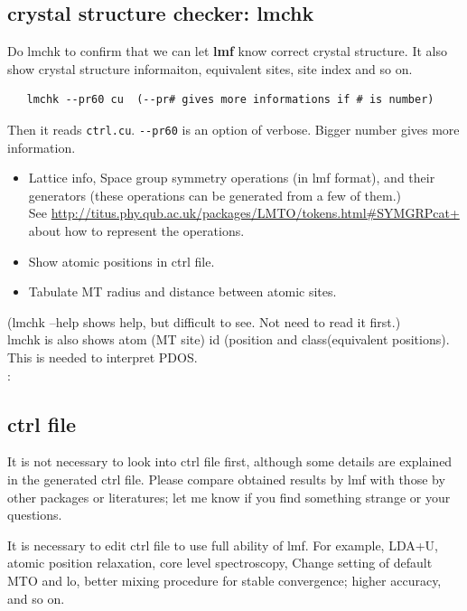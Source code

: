 \documentclass[a4paper,10pt,epsf,fleqn]{article}
\newcommand{\exe}[1]{{\bf #1}\index{#1}}
\begin{document}
\subsection{crystal structure checker: lmchk}
Do lmchk to confirm that we can let \exe{lmf} know correct crystal
structure. It also show crystal structure informaiton, equivalent sites,
site index and so on.
\begin{verbatim}
   lmchk --pr60 cu  (--pr# gives more informations if # is number)
\end{verbatim}
Then it reads \verb+ctrl.cu+. \verb+--pr60+ is an option of verbose. Bigger number gives more information.
\begin{itemize}
\item Lattice info, Space group symmetry operations (in lmf format), and
      their generators (these operations can be generated from a few of them.)\\
      See \url{http://titus.phy.qub.ac.uk/packages/LMTO/tokens.html#SYMGRPcat+}
      about how to represent the operations.
\item Show atomic positions in ctrl file. 
\item Tabulate MT radius and distance between atomic sites.
\end{itemize}
(lmchk --help shows help, but difficult to see. Not need to read it first.)\\

lmchk is also shows atom (MT site) id (position and class(equivalent
positions). This is needed to interpret PDOS.\\

:

\subsection{ctrl file}
It is not necessary to look into ctrl file first, 
although some details are explained in the generated ctrl file.
Please compare obtained results by lmf with those by other packages or literatures; 
let me know if you find something strange or your questions.

It is necessary to edit ctrl file to use full ability of lmf.
For example, LDA+U, atomic position relaxation, core level
spectroscopy, Change setting of default MTO and lo,
better mixing procedure for stable convergence; higher accuracy, and so on. 
\end{document}
